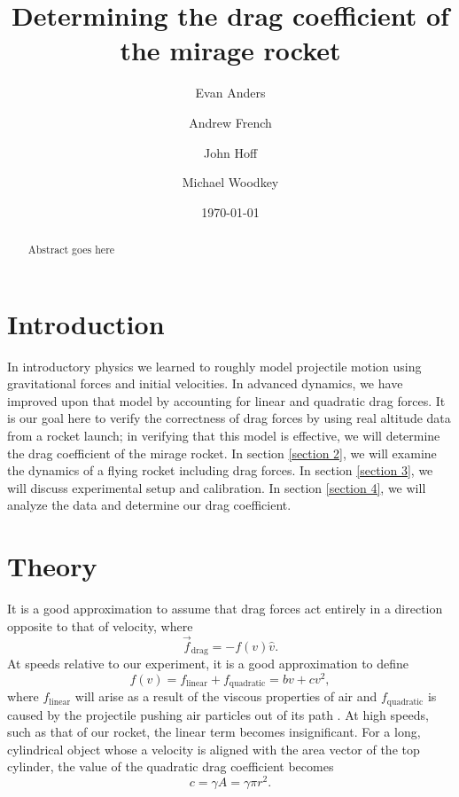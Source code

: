 \documentclass[aps,pra,twocolumn]{revtex4-1}
\begin{document}
\title{Determining the drag coefficient of the mirage rocket}

\author{Evan Anders}
\author{Andrew French}
\author{John Hoff}
\author{Michael Woodkey}


\date{\today}

\begin{abstract}
Abstract goes here
\end{abstract}



\maketitle


\section{\label{section1} Introduction}
In introductory physics we learned to roughly model projectile motion using gravitational forces and initial velocities.  In advanced dynamics, we have improved upon that model by accounting for linear and quadratic drag forces.  It is our goal here to verify the correctness of drag forces by using real altitude data from a rocket launch; in verifying that this model is effective, we will determine the drag coefficient of the mirage rocket.  In section \ref{section 2}, we will examine the dynamics of a flying rocket including drag forces.  In section \ref{section 3}, we will discuss experimental setup and calibration.  In section \ref{section 4}, we will analyze the data and determine our drag coefficient.



\section{\label{section 2} Theory}
It is a good approximation to assume that drag forces act entirely in a direction opposite to that of velocity, where
\begin{equation}
\vec{f}_\text{drag} = - f(v) \hat{v}.
\end{equation}
At speeds relative to our experiment, it is a good approximation to define
\begin{equation}
f(v) = f_\text{linear} + f_\text{quadratic} = b v + c v^2 ,
\end{equation}
where $f_\text{linear}$ will arise as a result of the viscous properties of air and $f_\text{quadratic}$ is caused by the projectile pushing air particles out of its path \cite{taylor2005}.  At high speeds, such as that of our rocket, the linear term becomes insignificant.  For a long, cylindrical object whose a velocity is aligned with the area vector of the top cylinder, the value of the quadratic drag coefficient becomes
\begin{equation}
c = \gamma A = \gamma \pi r^2.
\end{equation}
\end{document}
